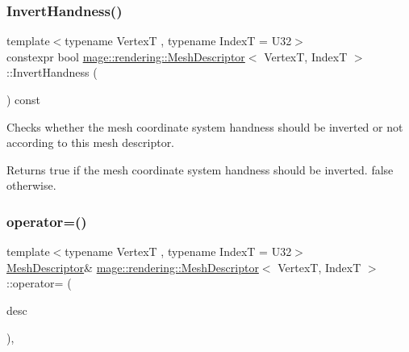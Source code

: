 \subsubsection{\texorpdfstring{Invert\+Handness()}{InvertHandness()}}
{\footnotesize\ttfamily template$<$typename VertexT , typename IndexT  = U32$>$ \\
constexpr bool \mbox{\hyperlink{classmage_1_1rendering_1_1_mesh_descriptor}{mage\+::rendering\+::\+Mesh\+Descriptor}}$<$ VertexT, IndexT $>$\+::Invert\+Handness (\begin{DoxyParamCaption}{ }\end{DoxyParamCaption}) const\hspace{0.3cm}{\ttfamily [noexcept]}}

Checks whether the mesh coordinate system handness should be inverted or not according to this mesh descriptor.

\begin{DoxyReturn}{Returns}
{\ttfamily true} if the mesh coordinate system handness should be inverted. {\ttfamily false} otherwise. 
\end{DoxyReturn}
\mbox{\label{classmage_1_1rendering_1_1_mesh_descriptor_a5181764e459caf5356c6d4b4b5268c1d}} 
\subsubsection{\texorpdfstring{operator=()}{operator=()}\hspace{0.1cm}{\footnotesize\ttfamily [1/2]}}
{\footnotesize\ttfamily template$<$typename VertexT , typename IndexT  = U32$>$ \\
\mbox{\hyperlink{classmage_1_1rendering_1_1_mesh_descriptor}{Mesh\+Descriptor}}\& \mbox{\hyperlink{classmage_1_1rendering_1_1_mesh_descriptor}{mage\+::rendering\+::\+Mesh\+Descriptor}}$<$ VertexT, IndexT $>$\+::operator= (\begin{DoxyParamCaption}\item[{const \mbox{\hyperlink{classmage_1_1rendering_1_1_mesh_descriptor}{Mesh\+Descriptor}}$<$ VertexT, IndexT $>$ \&}]{desc }\end{DoxyParamCaption})\hspace{0.3cm}{\ttfamily [default]}, {\ttfamily [noexcept]}}


